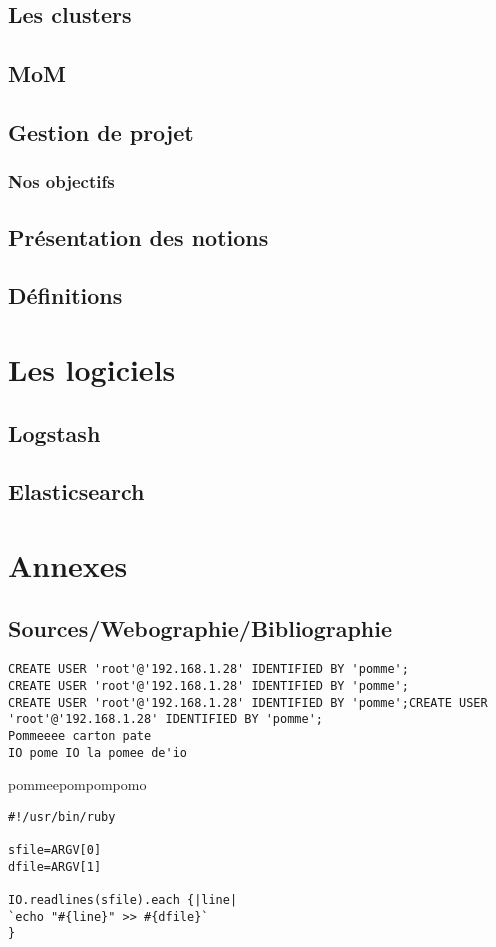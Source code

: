 \documentclass[a4paper,12pt,one side,titlepage]{report}
\begin{document}
\lipsum
\chapter{Les clusters}

\lipsum

\chapter{MoM}

\lipsum
\lipsum

\chapter{Gestion de projet}
\lipsum
%
\section{Nos objectifs}
\lipsum
\chapter{Présentation des notions}
\chapter{Définitions}

\part{Les logiciels}
\chapter{Logstash}


\chapter{Elasticsearch}



\part{Annexes}
\chapter{Sources/Webographie/Bibliographie}



\begin{lstlisting}[style=code]
CREATE USER 'root'@'192.168.1.28' IDENTIFIED BY 'pomme';
CREATE USER 'root'@'192.168.1.28' IDENTIFIED BY 'pomme';
CREATE USER 'root'@'192.168.1.28' IDENTIFIED BY 'pomme';CREATE USER 'root'@'192.168.1.28' IDENTIFIED BY 'pomme';
Pommeeee carton pate
IO pome IO la pomee de'io
\end{lstlisting}

pommeepompompomo

\begin{lstlisting}[style=code]
#!/usr/bin/ruby

sfile=ARGV[0]
dfile=ARGV[1]

IO.readlines(sfile).each {|line|
`echo "#{line}" >> #{dfile}`
}
\end{lstlisting}

\printglossaries
\end{document}
